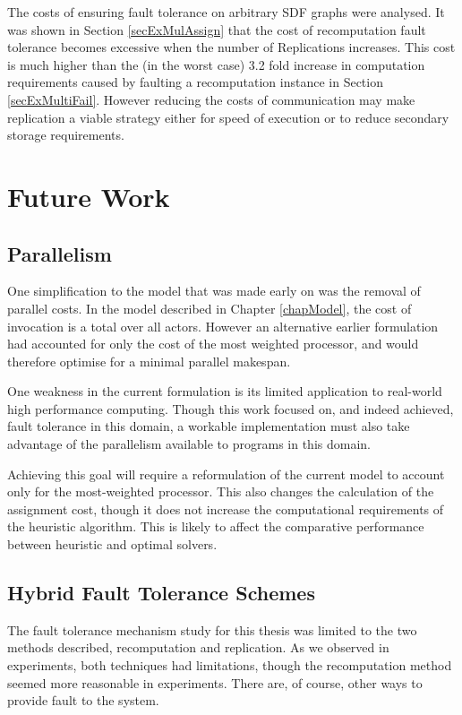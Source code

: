 The costs of ensuring fault tolerance on arbitrary SDF graphs were analysed.
It was shown in Section \ref{secExMulAssign} that the cost of recomputation fault tolerance becomes excessive when the number of Replications increases.
This cost is much higher than the (in the worst case) 3.2 fold increase in computation requirements caused by faulting a recomputation instance in Section \ref{secExMultiFail}.
However reducing the costs of communication may make replication a viable strategy either for speed of execution or to reduce secondary storage requirements.

\section{Future Work}
\label{secConFut}

\subsection{Parallelism}

One simplification to the model that was made early on was the removal of parallel costs.
In the model described in Chapter \ref{chapModel}, the cost of invocation is a total over all actors.
However an alternative earlier formulation had accounted for only the cost of the most weighted processor, and would therefore optimise for a minimal parallel makespan.

One weakness in the current formulation is its limited application to real-world high performance computing.
Though this work focused on, and indeed achieved, fault tolerance in this domain, a workable implementation must also take advantage of the parallelism available to programs in this domain.

Achieving this goal will require a reformulation of the current model to account only for the most-weighted processor.
This also changes the calculation of the assignment cost, though it does not increase the computational requirements of the heuristic algorithm.
This is likely to affect the comparative performance between heuristic and optimal solvers.

\subsection{Hybrid Fault Tolerance Schemes}

The fault tolerance mechanism study for this thesis was limited to the two methods described, recomputation and replication.
As we observed in experiments, both techniques had limitations, though the recomputation method seemed more reasonable in experiments.
There are, of course, other ways to provide fault to the system.

